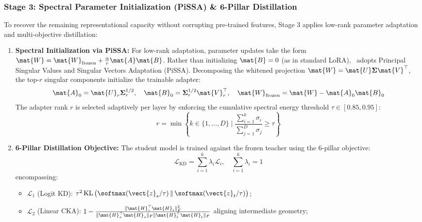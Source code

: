 \subsubsection{Stage 3: Spectral Parameter Initialization (PiSSA) \& 6-Pillar Distillation}
To recover the remaining representational capacity without corrupting pre-trained features, Stage 3 applies low-rank parameter adaptation and multi-objective distillation:
\begin{enumerate}
    \item \textbf{Spectral Initialization via PiSSA:} For low-rank adaptation, parameter updates take the form $\mat{W} = \mat{W}_{\text{frozen}} + \frac{\alpha}{r} \mat{A}\mat{B}$. Rather than initializing $\mat{B}=0$ (as in standard LoRA), \neuralops\ adopts Principal Singular Values and Singular Vectors Adaptation (PiSSA). Decomposing the whitened projection $\mat{W} = \mat{U} \boldsymbol{\Sigma} \mat{V}^\top$, the top-$r$ singular components initialize the trainable adapter:
    \begin{equation}
        \mat{A}_0 = \mat{U}_r \boldsymbol{\Sigma}_r^{1/2}, \quad \mat{B}_0 = \boldsymbol{\Sigma}_r^{1/2} \mat{V}_r^\top, \quad \mat{W}_{\text{frozen}} = \mat{W} - \mat{A}_0 \mat{B}_0
        \label{eq:pissa_init}
    \end{equation}
    The adapter rank $r$ is selected adaptively per layer by enforcing the cumulative spectral energy threshold $\tau \in [0.85, 0.95]$:
    \begin{equation}
        r = \min \left\{ k \in \{1, \dots, D\} \;\Bigg|\; \frac{\sum_{i=1}^k \sigma_i}{\sum_{j=1}^D \sigma_j} \ge \tau \right\}
        \label{eq:spectral_energy_threshold}
    \end{equation}
    \item \textbf{6-Pillar Distillation Objective:} The student model is trained against the frozen teacher using the 6-pillar objective:
    \begin{equation}
        \mathcal{L}_{\text{KD}} = \sum_{i=1}^6 \lambda_i \mathcal{L}_i, \quad \sum_{i=1}^6 \lambda_i = 1
        \label{eq:6pillar_loss_sys}
    \end{equation}
    encompassing:
    \begin{itemize}
        \item $\mathcal{L}_1$ (Logit KD): $\tau^2 \operatorname{KL}\big(\softmax(\vect{z}_s/\tau) \,\|\, \softmax(\vect{z}_t/\tau)\big)$;
        \item $\mathcal{L}_2$ (Linear CKA): $1 - \frac{\|\mat{H}_s^\top \mat{H}_t\|_F^2}{\|\mat{H}_s^\top \mat{H}_s\|_F \|\mat{H}_t^\top \mat{H}_t\|_F}$ aligning intermediate geometry;

\end{itemize}
\end{enumerate}
